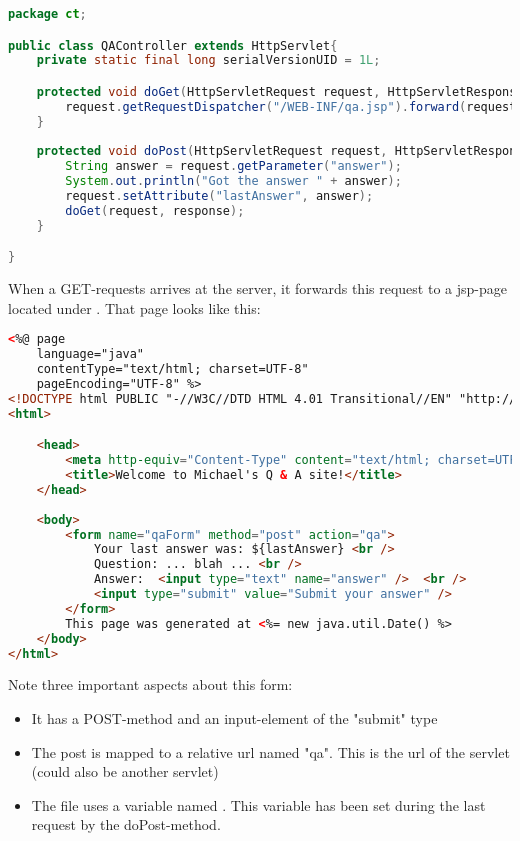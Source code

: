 \begin{lstlisting}[language=java]
package ct;

public class QAController extends HttpServlet{
	private static final long serialVersionUID = 1L;

	protected void doGet(HttpServletRequest request, HttpServletResponse response) throws ServletException, IOException {
	    request.getRequestDispatcher("/WEB-INF/qa.jsp").forward(request, response);
	}
	
	protected void doPost(HttpServletRequest request, HttpServletResponse response) throws ServletException, IOException {
		String answer = request.getParameter("answer");
		System.out.println("Got the answer " + answer);
		request.setAttribute("lastAnswer", answer);
		doGet(request, response);
	}

}
\end{lstlisting}

When a GET-requests arrives  at the server, it forwards this request to a jsp-page located under . That page looks like this: 

\begin{lstlisting}[language=html]
<%@ page 
	language="java" 
	contentType="text/html; charset=UTF-8"
	pageEncoding="UTF-8" %>
<!DOCTYPE html PUBLIC "-//W3C//DTD HTML 4.01 Transitional//EN" "http://www.w3.org/TR/html4/loose.dtd">
<html>

	<head>
		<meta http-equiv="Content-Type" content="text/html; charset=UTF-8">
		<title>Welcome to Michael's Q & A site!</title>
	</head>
	
	<body>
		<form name="qaForm" method="post" action="qa">
			Your last answer was: ${lastAnswer} <br />
			Question: ... blah ... <br /> 
			Answer:  <input type="text" name="answer" />  <br /> 
			<input type="submit" value="Submit your answer" />
		</form>
		This page was generated at <%= new java.util.Date() %>
	</body>
</html>
\end{lstlisting}

Note three important aspects about this form: 
\begin{itemize}
    \item It has a POST-method and an input-element of the "submit" type
    \item The post is mapped to a relative url named "qa". This is the url of the servlet (could also be another servlet)
    \item The file uses a variable named . This variable has been set during the last request by the doPost-method. 
\end{itemize}



